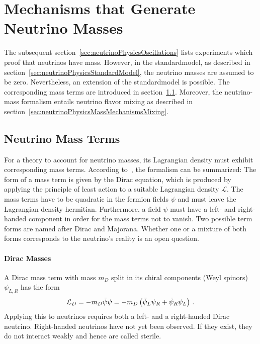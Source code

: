\section{Mechanisms that Generate Neutrino Masses}
\label{sec:neutrinoPhysicsMassMechanisms}
The subsequent section~\ref{sec:neutrinoPhysicsOscillations} lists experiments which proof that neutrinos have mass. However, in the \gls{standardmodel}, as described in section~\ref{sec:neutrinoPhysicsStandardModel}, the neutrino masses are assumed to be zero. Nevertheless, an extension of the \gls{standardmodel} is possible. The corresponding mass terms are introduced in section~\ref{sec:neutrinoPhysicsMassMechanismsTerms}. Moreover, the neutrino-mass formalism entails neutrino flavor mixing as described in section~\ref{sec:neutrinoPhysicsMassMechanismsMixing}.

\subsection{Neutrino Mass Terms}
\label{sec:neutrinoPhysicsMassMechanismsTerms}
For a theory to account for neutrino masses, its Lagrangian density must exhibit corresponding mass terms. According to~\cite{zuber2011neutrino}, the formalism can be summarized: The form of a mass term is given by the Dirac equation, which is produced by applying the principle of least action to a suitable Lagrangian density $\mathcal{L}$. The mass terms have to be quadratic in the fermion fields $\psi$ and must leave the Lagrangian density hermitian. Furthermore, a field $\psi$ must have a left- and right-handed component in order for the mass terms not to vanish. Two possible term forms are named after Dirac and Majorana. Whether one or a mixture of both forms corresponds to the neutrino's reality is an open question.

\paragraph{Dirac Masses}
A Dirac mass term with mass $m_D$ split in its chiral components (Weyl spinors) $\psi_{L,R}$ has the form~\cite{zuber2011neutrino}
\begin{equation}
\mathcal{L}_D =  -m_D \bar\psi\psi = -m_D \left(\bar\psi_L\psi_R + \bar\psi_R\psi_L \right) \text{\,.}
\end{equation}
Applying this to neutrinos requires both a left- and a right-handed Dirac neutrino. Right-handed neutrinos have not yet been observed. If they exist, they do not interact weakly and hence are called sterile.


